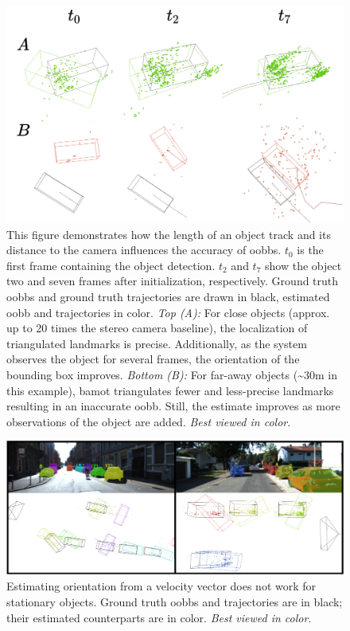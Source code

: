 \documentclass[headsepline, hidelinks, footsepline, footinclude=false, oneside, fontsize=11pt, paper=a4, listof=totoc, bibliography=totoc]{scrbook}
\begin{document}
\begin{figure}[htbp]
\centering
\includegraphics[width=\textwidth]{figures/bounding-box-regression.pdf}
\caption{\label{fig:bounding-box-regression}This figure demonstrates how the length of an object track and its distance to the camera influences the accuracy of \glspl{oobb}. \(t_0\) is the first frame containing the object detection. \(t_2\) and \(t_7\) show the object two and seven frames after initialization, respectively. Ground truth \glspl{oobb} and ground truth trajectories are drawn in black, estimated \gls{oobb} and trajectories in color. \emph{Top (A):} For close objects (approx. up to 20 times the stereo camera baseline), the localization of triangulated landmarks is precise. Additionally, as the system observes the object for several frames, the orientation of the bounding box improves. \emph{Bottom (B):} For far-away objects (\textasciitilde{}30m in this example), \gls{bamot} triangulates fewer and less-precise landmarks resulting in an inaccurate \gls{oobb}. Still, the estimate improves as more observations of the object are added. \emph{Best viewed in color}.}
\end{figure}

\begin{figure}[htbp]
\centering
\includegraphics[width=\textwidth]{figures/stationary-objects.pdf}
\caption{\label{fig:stationary-objects}Estimating orientation from a velocity vector does not work for stationary objects. Ground truth \glspl{oobb} and trajectories are in black; their estimated counterparts are in color. \emph{Best viewed in color}.}
\end{figure}
\end{document}
